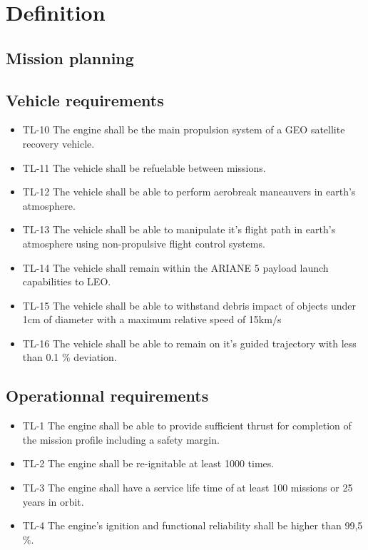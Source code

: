 \chapter{Definition}
\section{Mission planning}

\section{Vehicle requirements}
\begin{itemize}
    \item TL-10 The engine shall be the main propulsion system of a GEO satellite recovery vehicle.

    \item TL-11 The vehicle shall be refuelable between missions.

    \item TL-12 The vehicle shall be able to perform aerobreak maneauvers in earth's atmosphere.

    \item TL-13 The vehicle shall be able to manipulate it's flight path in earth's atmosphere using non-propulsive flight control systems.

    \item TL-14 The vehicle shall remain within the ARIANE 5 payload launch capabilities to LEO.

    \item TL-15 The vehicle shall be able to withstand debris impact of objects under 1cm of diameter with a maximum relative speed of 15km/s

    \item TL-16 The vehicle shall be able to remain on it's guided trajectory with less than 0.1 $\%$ deviation.
\end{itemize}{}


\section{Operationnal requirements}
\begin{itemize}
    \item TL-1 The engine shall be able to provide sufficient thrust for completion of the mission profile including a safety margin.

    \item TL-2 The engine shall be re-ignitable at least 1000 times.

    \item TL-3 The engine shall have a service life time of at least 100 missions or 25 years in orbit.

    \item TL-4 The engine's ignition and functional reliability shall be higher than 99,5$\%$.
\end{itemize}

